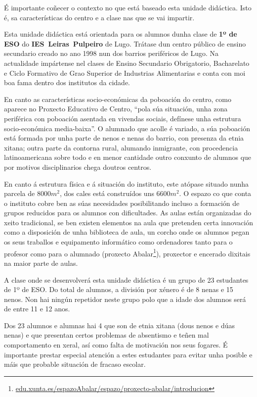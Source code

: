 
É importante coñecer o contexto no que está baseado esta unidade didáctica. Isto é, sa características do centro e a clase nas que se vai impartir.

Esta unidade didáctica está orientada para os alumnos dunha clase de \textbf{1º de ESO} do \textbf{IES~Leiras~Pulpeiro} de Lugo. Trátase dun centro público de ensino secundario creado no ano 1998 nun dos barrios periféricos de Lugo. Na actualidade impártense nel clases de Ensino Secundario Obrigatorio, Bacharelato e Ciclo Formativo de Grao Superior de Industrias Alimentarias e conta con moi boa fama dentro dos institutos da cidade.

En canto as características socio-económicas da poboación do centro, como aparece no Proxecto Educativo de Centro, ``pola súa situación, unha zona periférica con poboación asentada en vivendas sociais, defínese unha estrutura socio-económica media-baixa''. O alumnado que acolle é variado, a súa poboación está formada por unha parte de nenos e nenas do barrio, con presenza da etnia xitana; outra parte da contorna rural, alumando inmigrante, con procedencia latinoamericana sobre todo e en menor cantidade outro conxunto de alumnos que por motivos disciplinarios chega doutros centros.

En canto á estrutura física e á situación do instituto, este atópase situado nunha parcela de $8000 m^2$, dos cales está construídos uns $6600 m^2$. O espazo co que conta o instituto cobre ben as súas necesidades posibilitando incluso a formación de grupos reducidos para os alumnos con dificultades. As aulas están organizadas do xeito tradicional, se ben existen elementos na aula que pretenden certa innovación como a disposición de unha biblioteca de aula, un corcho onde os alumnos pegan os seus traballos e equipamento informático como ordenadores tanto para o profesor como para o alumnado (proxecto Abalar\footnote{\href{https://www.edu.xunta.es/espazoAbalar/espazo/proxecto-abalar/introducion}{edu.xunta.es/espazoAbalar/espazo/proxecto-abalar/introducion}}), proxector e encerado dixitais na maior parte de aulas.

A clase onde se desenvolverá esta unidade didáctica é un grupo de 23 estudantes de 1º de ESO. Do total de alumnos, a división por xénero é de 8 nenas e 15 nenos. Non hai ningún repetidor neste grupo polo que a idade dos alumnos será de entre 11 e 12 anos.

Dos 23 alumnos e alumnas hai 4 que son de etnia xitana (dous nenos e dúas nenas) e que presentan certos problemas de absentismo e teñen mal comportamento en xeral, así como falta de motivación nos seus fogares. É importante prestar especial atención a estes estudantes para evitar unha posible e máis que probable situación de fracaso escolar.


